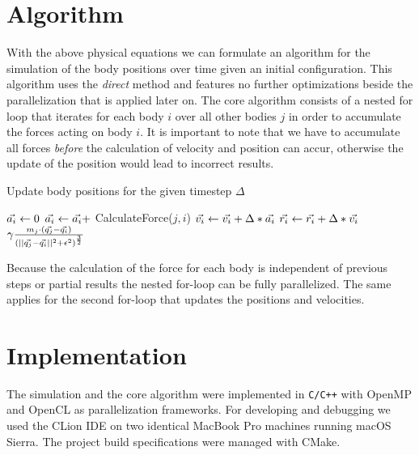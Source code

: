 \documentclass[a4paper,11pt]{scrartcl} %
\newcommand*{\vv}[1]{\vec{\mkern0mu#1}}
\begin{document}
\section{Algorithm}
With the above physical equations we can formulate an algorithm for the simulation of the body positions over time given an initial configuration. This algorithm uses the \textit{direct} method and features no further optimizations beside the parallelization that is applied later on. The core algorithm consists of a nested for loop that iterates for each body $i$ over all other bodies $j$ in order to accumulate the forces acting on body $i$. It is important to note that we have to accumulate all forces \textit{before} the calculation of velocity and position can accur, otherwise the update of the position would lead to incorrect results.
\begin{algorithm}[H]
\caption{Update body positions for the given timestep $\Delta$}
\begin{algorithmic}[1]
      \State $\vv{a_i} \gets 0$ 
        \State $\vv{a_i} \gets \vv{a_i} + $ CalculateForce($j,i$)
      \EndFor
   \EndFor
      \State $\vv{v_i} \gets \vv{v_i} + \Delta * \vv{a_i}$ 
      \State $\vv{r_i} \gets \vv{r_i} + \Delta * \vv{v_i}$ 
   \EndFor
\EndProcedure\\
	\State \Return $\gamma \frac{m_j \cdot (\vv{q_j} - \vv{q_i})}{(||\vv{q_j} - \vv{q_i}||^2 + \epsilon^2)^\frac{3}{2}}$
\EndProcedure
\end{algorithmic}
\label{alg:core}
\end{algorithm}

Because the calculation of the force for each body is independent of previous steps or partial results the nested for-loop can be fully parallelized. The same applies for the second for-loop that updates the positions and velocities.

\section{Implementation}
The simulation and the core algorithm were implemented in \texttt{C/C++} with OpenMP \cite{openmp} and OpenCL \cite{opencl} as parallelization frameworks. For developing and debugging we used the CLion IDE \cite{clion} on two identical MacBook Pro machines running macOS Sierra. The project build specifications were managed with CMake.
\end{document}
